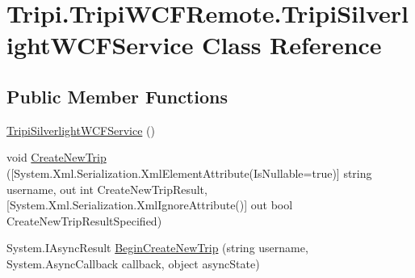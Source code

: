 \hypertarget{class_tripi_1_1_tripi_w_c_f_remote_1_1_tripi_silverlight_w_c_f_service}{
\section{Tripi.TripiWCFRemote.TripiSilverlightWCFService Class Reference}
\label{class_tripi_1_1_tripi_w_c_f_remote_1_1_tripi_silverlight_w_c_f_service}
}


 
\subsection*{Public Member Functions}
\begin{DoxyCompactItemize}
\item 
\hypertarget{class_tripi_1_1_tripi_w_c_f_remote_1_1_tripi_silverlight_w_c_f_service_a6d5f296616c162f3397f74d13a136823}{
\hyperlink{class_tripi_1_1_tripi_w_c_f_remote_1_1_tripi_silverlight_w_c_f_service_a6d5f296616c162f3397f74d13a136823}{TripiSilverlightWCFService} ()}
\label{class_tripi_1_1_tripi_w_c_f_remote_1_1_tripi_silverlight_w_c_f_service_a6d5f296616c162f3397f74d13a136823}

\begin{DoxyCompactList}\small\item\em \item\end{DoxyCompactList}\item 
\hypertarget{class_tripi_1_1_tripi_w_c_f_remote_1_1_tripi_silverlight_w_c_f_service_a7f83cd4acc3ff7e25942773b5fe47c64}{
void \hyperlink{class_tripi_1_1_tripi_w_c_f_remote_1_1_tripi_silverlight_w_c_f_service_a7f83cd4acc3ff7e25942773b5fe47c64}{CreateNewTrip} (\mbox{[}System.Xml.Serialization.XmlElementAttribute(IsNullable=true)\mbox{]} string username, out int CreateNewTripResult,\mbox{[}System.Xml.Serialization.XmlIgnoreAttribute()\mbox{]} out bool CreateNewTripResultSpecified)}
\label{class_tripi_1_1_tripi_w_c_f_remote_1_1_tripi_silverlight_w_c_f_service_a7f83cd4acc3ff7e25942773b5fe47c64}

\begin{DoxyCompactList}\small\item\em \item\end{DoxyCompactList}\item 
\hypertarget{class_tripi_1_1_tripi_w_c_f_remote_1_1_tripi_silverlight_w_c_f_service_abf2b890589d02675acf98203d7241616}{
System.IAsyncResult \hyperlink{class_tripi_1_1_tripi_w_c_f_remote_1_1_tripi_silverlight_w_c_f_service_abf2b890589d02675acf98203d7241616}{BeginCreateNewTrip} (string username, System.AsyncCallback callback, object asyncState)}
\label{class_tripi_1_1_tripi_w_c_f_remote_1_1_tripi_silverlight_w_c_f_service_abf2b890589d02675acf98203d7241616}


\end{DoxyCompactItemize}
